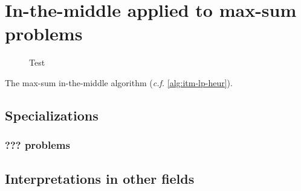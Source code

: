 \section{In-the-middle applied to max-sum problems}

\begin{figure}
	\subfloat[Test]{}
	\caption{Test}
\end{figure}

\begin{algorithm}[tbp]

	\caption{The max-sum in-the-middle algorithm (\emph{c.f.} \cref{alg:itm-lp-heur}).}
	\label{alg:itm-max-sum}
\end{algorithm}

\subsection{Specializations}

\subsubsection{??? problems}


\subsection{Interpretations in other fields}

